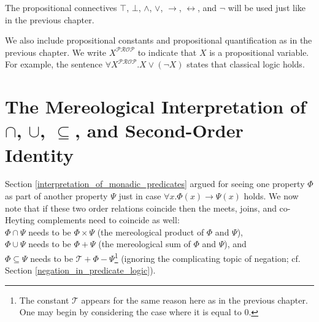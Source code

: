 \documentclass[12pt]{book}
\begin{document}
The propositional connectives $\top$, $\bot$, $\wedge$, $\vee$, $\rightarrow$, $\leftrightarrow$, and $\neg$ will be used just like in the previous chapter. 

We also include propositional constants and propositional quantification as in the previous chapter. We write $X^{\mathcal{PROP}}$ to indicate that $X$ is a propositional variable. For example, the sentence $\forall X^{\mathcal{PROP}}. X \vee (\neg X)$ states that classical logic holds.

\section{The Mereological Interpretation of $\cap$, $\cup$, $\subseteq$, and Second-Order Identity} \label{interpretation_of_cap_and_cup}
Section \ref{interpretation_of_monadic_predicates} argued for seeing one property $\Phi$ as part of another property $\Psi$ just in case $\forall x.\Phi(x) \rightarrow \Psi(x)$ holds. We now note that if these two order relations coincide then the meets, joins, and co-Heyting complements need to coincide as well:\\
\indent* $\Phi \cap \Psi$ needs to be $\Phi \times \Psi$ (the mereological product of $\Phi$ and $\Psi$),\\
\indent* $\Phi \cup \Psi$ needs to be $\Phi + \Psi$ (the mereological sum of $\Phi$ and $\Psi$), and\\
\indent* $\Phi \subseteq \Psi$ needs to be $\mathcal{T} + \Phi - \Psi$\footnote{The constant $\mathcal{T}$ appears for the same reason here as in the previous chapter. One may begin by considering the case where it is equal to $0$.} (ignoring the complicating topic of negation; cf. Section \ref{negation_in_predicate_logic}).
\end{document}
